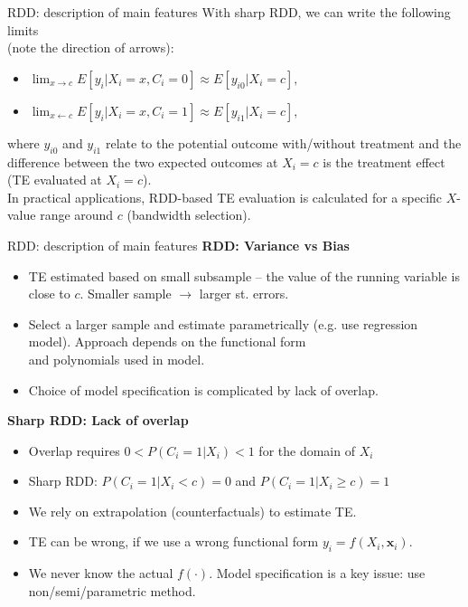 \documentclass{beamer}
\begin{document}
\begin{frame}{RDD: description of main features}
With sharp RDD, we can write the following limits \\(note the direction of arrows):\\ \medskip
\begin{itemize}
    \item $\lim_{x\rightarrow c}E[y_i|X_i =x, C_i=0] \approx E[y_{i0}|X_i = c],$
    \medskip
    \item $\lim_{x \leftarrow c}E[y_i|X_i =x, C_i=1] \approx E[y_{i1}|X_i = c],$
\end{itemize} \medskip
where $y_{i0}$ and $y_{i1}$ relate to the potential outcome with/without treatment and the difference between the two expected outcomes at $X_i=c$ is the treatment effect (TE evaluated at $X_i=c$). \\ \bigskip
In practical applications, RDD-based TE evaluation is calculated for a specific $X$-value range around $c$ (bandwidth selection).
\end{frame}
\begin{frame}{RDD: description of main features}
\textbf{RDD: Variance vs Bias}
\begin{itemize}
    \item TE estimated based on small subsample -- the value of the running variable is close to $c$. Smaller sample $\rightarrow$ larger st. errors.
    \item Select a larger sample and estimate parametrically (e.g. use regression model). Approach depends on  the functional form \\and polynomials used in model. 
    \item Choice of model specification is complicated by lack of overlap.
\end{itemize}
\bigskip
\textbf{Sharp RDD: Lack of overlap}
\begin{itemize}
    \item Overlap requires $0 < P(C_i = 1|X_i ) < 1$ for the domain of $X_i$
    \item Sharp RDD: $P(C_i = 1|X_i < c) = 0$ and $P(C_i = 1|X_i \geq c) = 1$
    \item We rely on extrapolation (counterfactuals) to estimate TE.
    \item TE can be wrong, if we use a wrong functional form $y_i = f(X_i,\bm{x}_i )$.
    \item We never know the actual $f(\cdot)$. Model specification is a key issue: use non/semi/parametric method.
\end{itemize}
\end{frame}
\end{document}
